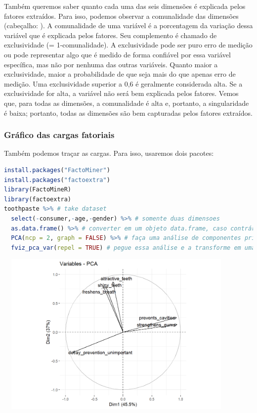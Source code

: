 \documentclass{article}
\begin{document}
Também queremos saber quanto cada uma das seis dimensões é explicada pelos fatores extraídos. Para isso, podemos observar a comunalidade das dimensões (cabeçalho: ). A comunalidade de uma variável é a porcentagem da variação dessa variável que é explicada pelos fatores. Seu complemento é chamado de exclusividade (= 1-comunalidade). A exclusividade pode ser puro erro de medição ou pode representar algo que é medido de forma confiável por essa variável específica, mas não por nenhuma das outras variáveis. Quanto maior a exclusividade, maior a probabilidade de que seja mais do que apenas erro de medição. Uma exclusividade superior a 0,6 é geralmente considerada alta. Se a exclusividade for alta, a variável não será bem explicada pelos fatores. Vemos que, para todas as dimensões, a comunalidade é alta e, portanto, a singularidade é baixa; portanto, todas as dimensões são bem capturadas pelos fatores extraídos.

\subsubsection{Gráfico das cargas fatoriais}

Também podemos traçar as cargas. Para isso, usaremos dois pacotes:

\begin{lstlisting}[language=R]
install.packages("FactoMiner")
install.packages("factoextra")
library(FactoMineR)
library(factoextra)
toothpaste %>% # take dataset
  select(-consumer,-age,-gender) %>% # somente duas dimensoes
  as.data.frame() %>% # converter em um objeto data.frame, caso contrário, o PCA não o aceitará
  PCA(ncp = 2, graph = FALSE) %>% # faça uma análise de componentes principais e retenha 2 fatores
  fviz_pca_var(repel = TRUE) # pegue essa análise e a transforme em uma visualização

\end{lstlisting}




\begin{center}
\includegraphics[width=12cm,height=8cm]{perceptual_tp_loading_plot-1.png}
\end{center}
\end{document}
